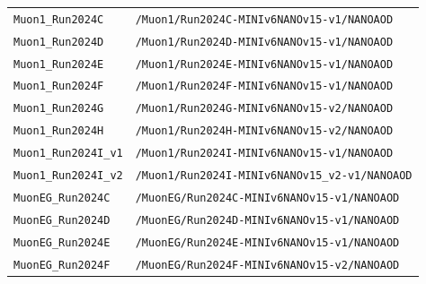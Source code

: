 \begin{longtable}{@{}>{\RaggedRight\arraybackslash}p{} >{\RaggedRight\arraybackslash}p{}@{}}
\addlinespace[2pt]
\texttt{Muon1\_\allowbreak{}Run2024C} & \texttt{/\allowbreak{}Muon1/\allowbreak{}Run2024C-\allowbreak{}MINIv6NANOv15-\allowbreak{}v1/\allowbreak{}NANOAOD} \\
\addlinespace[2pt]
\texttt{Muon1\_\allowbreak{}Run2024D} & \texttt{/\allowbreak{}Muon1/\allowbreak{}Run2024D-\allowbreak{}MINIv6NANOv15-\allowbreak{}v1/\allowbreak{}NANOAOD} \\
\addlinespace[2pt]
\texttt{Muon1\_\allowbreak{}Run2024E} & \texttt{/\allowbreak{}Muon1/\allowbreak{}Run2024E-\allowbreak{}MINIv6NANOv15-\allowbreak{}v1/\allowbreak{}NANOAOD} \\
\addlinespace[2pt]
\texttt{Muon1\_\allowbreak{}Run2024F} & \texttt{/\allowbreak{}Muon1/\allowbreak{}Run2024F-\allowbreak{}MINIv6NANOv15-\allowbreak{}v1/\allowbreak{}NANOAOD} \\
\addlinespace[2pt]
\texttt{Muon1\_\allowbreak{}Run2024G} & \texttt{/\allowbreak{}Muon1/\allowbreak{}Run2024G-\allowbreak{}MINIv6NANOv15-\allowbreak{}v2/\allowbreak{}NANOAOD} \\
\addlinespace[2pt]
\texttt{Muon1\_\allowbreak{}Run2024H} & \texttt{/\allowbreak{}Muon1/\allowbreak{}Run2024H-\allowbreak{}MINIv6NANOv15-\allowbreak{}v2/\allowbreak{}NANOAOD} \\
\addlinespace[2pt]
\texttt{Muon1\_\allowbreak{}Run2024I\_\allowbreak{}v1} & \texttt{/\allowbreak{}Muon1/\allowbreak{}Run2024I-\allowbreak{}MINIv6NANOv15-\allowbreak{}v1/\allowbreak{}NANOAOD} \\
\addlinespace[2pt]
\texttt{Muon1\_\allowbreak{}Run2024I\_\allowbreak{}v2} & \texttt{/\allowbreak{}Muon1/\allowbreak{}Run2024I-\allowbreak{}MINIv6NANOv15\_\allowbreak{}v2-\allowbreak{}v1/\allowbreak{}NANOAOD} \\
\addlinespace[2pt]
\texttt{MuonEG\_\allowbreak{}Run2024C} & \texttt{/\allowbreak{}MuonEG/\allowbreak{}Run2024C-\allowbreak{}MINIv6NANOv15-\allowbreak{}v1/\allowbreak{}NANOAOD} \\
\addlinespace[2pt]
\texttt{MuonEG\_\allowbreak{}Run2024D} & \texttt{/\allowbreak{}MuonEG/\allowbreak{}Run2024D-\allowbreak{}MINIv6NANOv15-\allowbreak{}v1/\allowbreak{}NANOAOD} \\
\addlinespace[2pt]
\texttt{MuonEG\_\allowbreak{}Run2024E} & \texttt{/\allowbreak{}MuonEG/\allowbreak{}Run2024E-\allowbreak{}MINIv6NANOv15-\allowbreak{}v1/\allowbreak{}NANOAOD} \\
\addlinespace[2pt]
\texttt{MuonEG\_\allowbreak{}Run2024F} & \texttt{/\allowbreak{}MuonEG/\allowbreak{}Run2024F-\allowbreak{}MINIv6NANOv15-\allowbreak{}v2/\allowbreak{}NANOAOD} \\

\end{longtable}
